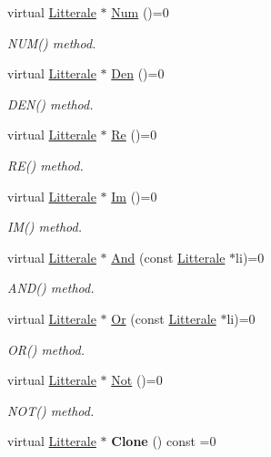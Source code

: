 \begin{DoxyCompactItemize}
virtual \hyperlink{class_litterale}{Litterale} $\ast$ \hyperlink{class_litterale_a4f02faabce1e1f46c4d34508de316a2b}{Num} ()=0
\begin{DoxyCompactList}\small\item\em N\+U\+M() method. \end{DoxyCompactList}\item 
virtual \hyperlink{class_litterale}{Litterale} $\ast$ \hyperlink{class_litterale_aedcaa806cc6b037371b25d12086503b8}{Den} ()=0
\begin{DoxyCompactList}\small\item\em D\+E\+N() method. \end{DoxyCompactList}\item 
virtual \hyperlink{class_litterale}{Litterale} $\ast$ \hyperlink{class_litterale_ac3ab556147c54f260be336fb53ecb52e}{Re} ()=0
\begin{DoxyCompactList}\small\item\em R\+E() method. \end{DoxyCompactList}\item 
virtual \hyperlink{class_litterale}{Litterale} $\ast$ \hyperlink{class_litterale_a8f0c2d98186c545f4f34ae07b9751f97}{Im} ()=0
\begin{DoxyCompactList}\small\item\em I\+M() method. \end{DoxyCompactList}\item 
virtual \hyperlink{class_litterale}{Litterale} $\ast$ \hyperlink{class_litterale_a2331619771c5cb74bee253e2c2cf62f5}{And} (const \hyperlink{class_litterale}{Litterale} $\ast$li)=0
\begin{DoxyCompactList}\small\item\em A\+N\+D() method. \end{DoxyCompactList}\item 
virtual \hyperlink{class_litterale}{Litterale} $\ast$ \hyperlink{class_litterale_a326ce76a35c3d29ad409c9491d5169a1}{Or} (const \hyperlink{class_litterale}{Litterale} $\ast$li)=0
\begin{DoxyCompactList}\small\item\em O\+R() method. \end{DoxyCompactList}\item 
virtual \hyperlink{class_litterale}{Litterale} $\ast$ \hyperlink{class_litterale_af44ae987ec5db62170efb3aec563c95c}{Not} ()=0
\begin{DoxyCompactList}\small\item\em N\+O\+T() method. \end{DoxyCompactList}\item 
virtual \hyperlink{class_litterale}{Litterale} $\ast$ {\bfseries Clone} () const  =0\hypertarget{class_litterale_a98f8da40c35c36275656d5bdb94482c5}{}\label{class_litterale_a98f8da40c35c36275656d5bdb94482c5}

\end{DoxyCompactItemize}


